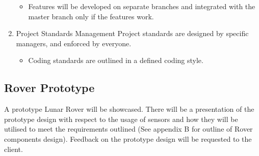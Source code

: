 \documentclass[11pt, a4paper]{article}
\begin{document}
\begin{flushleft}
\begin{enumerate}
\begin{itemize}
            \item Features will be developed on separate branches and integrated with the master branch only if the features work.
        \end{itemize}
    \item Project Standards Management
    	\linebreak Project standards are designed by specific managers, and enforced by everyone.
        \begin{itemize}
        	\item Coding standards are outlined in a defined coding style.
        \end{itemize}
	\end{enumerate}

\subsection{Rover Prototype}
	A prototype Lunar Rover will be showcased. There will be a presentation of the prototype design with respect to the usage of sensors and how they will be utilised to meet the requirements outlined (See appendix B for outline of Rover components design).
    \linebreak Feedback on the prototype design will be requested to the client.
  

\end{flushleft}
\end{document}
